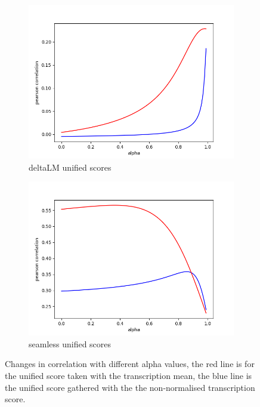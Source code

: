 \begin{figure}
    \centering
    \begin{subfigure}{0.4\linewidth}
        \includegraphics[width=\linewidth]{Latex/sections/images/dlmuniscoredistribution.png}
        \caption{deltaLM unified scores}
    \end{subfigure}
    \begin{subfigure}{0.4\linewidth}
        \includegraphics[width=\linewidth]{Latex/sections/images/seamlessuniscoredistribution.png}
        \caption{seamless unified scores}
    \end{subfigure}
    \caption{Changes in correlation with different alpha values, the red line is for the unified score taken with the transcription mean, the blue line is the unified score gathered with the the non-normalised transcription score. }
    \label{fig:uniscore correlation}
\end{figure}


